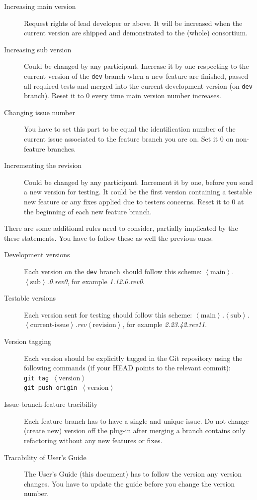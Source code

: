 \documentclass[11pt,a4paper]{book}
\newcommand{\placeholder}[1]{$\left\langle\text{#1}\right\rangle$}
\begin{document}
\begin{description}
	\item[Increasing main version] Request rights of lead developer or above. It will be increased when the current version are shipped and demonstrated to the (whole) consortium.
	\item[Increasing sub version] Could be changed by any participant. Increase it by one respecting to the current version of the \texttt{dev} branch when a new feature are finished, passed all required tests and merged into the current development version (on \texttt{dev} branch). Reset it to 0 every time main version number increases. 
	\item[Changing issue number] You have to set this part to be equal the identification number of the current issue associated to the feature branch you are on. Set it 0 on non-feature branches.
	\item[Incrementing the revision] Could be changed by any participant. Increment it by one, before you send a new version for testing. It could be the first version containing a testable new feature or any fixes applied due to testers concerns. Reset it to 0 at the beginning of each new feature branch.
\end{description}

There are some additional rules need to consider, partially implicated by the these statements. You have to follow these as well the previous ones.

\begin{description}
	\item[Development versions] Each version on the \texttt{dev} branch should follow this scheme: \emph{\placeholder{main}.\placeholder{sub}.0.rev0}, for example \emph{1.12.0.rev0}.
	\item[Testable versions] Each version sent for testing should follow this scheme: \emph{\placeholder{main}.\placeholder{sub}.\placeholder{current-issue}.rev\placeholder{revision}}, for example \emph{2.23.42.rev11}.
	\item[Version tagging] Each version should be explicitly tagged in the Git repository using the following commands (if your HEAD points to the relevant commit):\\\texttt{git tag \placeholder{version}\\git push origin \placeholder{version}}
	\item[Issue-branch-feature tracibility] Each feature branch has to have a single and unique issue. Do not change (create new) version off the plug-in after merging a branch contains only refactoring without any new features or fixes.
	\item[Tracability of User's Guide] The User's Guide (this document) has to follow the version any version changes. You have to update the guide before you change the version number.
\end{description}
\end{document}
